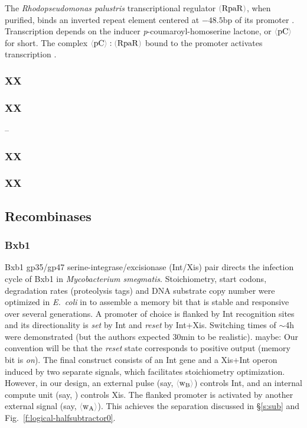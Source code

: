 \documentclass[12pt,notitlepage]{article}
\newcommand{\cbra}[1]{{\color{gray}\ensuremath{#1}}}
\newcommand{\signal}[1]{\ensuremath{\cbra{\langle}\mathrm{#1}\cbra{\rangle}}}
\newcommand{\protein}[1]{\ensuremath{\cbra{(}\mathrm{#1}\cbra{)}}}
\newcommand{\ra}[1]{{\color{Blue}#1}}
\begin{document}
\ra{
The \emph{Rhodopseudomonas palustris} transcriptional regulator
\protein{RpaR},
when purified,
binds an inverted repeat element 
centered at $-48.5$bp
of its promoter
\cite{HirakawaETAL2011}.
%
%
Transcription depends on 
the inducer 
\emph{p}-coumaroyl-homoserine lactone,
or \signal{pC} for short.
%
%
%
%
The complex 
$\signal{pC} : \protein{RpaR}$
bound to the promoter
activates transcription
\cite[Discussion]{HirakawaETAL2011}.
}


\subsubsection*{XX}



\subsubsection*{XX}

\ra{--}

\subsubsection*{XX}



\subsubsection*{XX}




\subsection{Recombinases}

\subsubsection*{Bxb1}


Bxb1 gp35/gp47
serine-integrase/excisionase
(Int/Xis)
pair
directs the infection cycle of Bxb1 
in
\emph{Mycobacterium smegmatis}.
%
Stoichiometry, start codons,
degradation rates (proteolysis tags)
and DNA substrate copy number 
were optimized 
in \emph{E.~coli}
in \cite{BonnetSubsoontornEndy2012}
to 
assemble a memory bit
that is
stable and responsive over several generations.
%
A promoter of choice is flanked 
by Int recognition sites
and
its directionality is 
\emph{set}
by Int
and 
\emph{reset}
by Int+Xis.
%
Switching times of $\sim$4h were demonstrated
(but the authors expected 30min to be realistic).
%
\ra{maybe:}
Our convention will be that
the \emph{reset} state corresponds to 
positive output (memory bit is \emph{on}).
%
The final construct
\cite[Fig.~4A]{BonnetSubsoontornEndy2012}
consists of an Int gene 
and
a Xis+Int operon
induced by two separate signals,
which facilitates stoichiometry optimization.
%
However, 
in our design,
an external pulse (say, \signal{w_B}) controls Int,
and
an internal compute unit (say, ) controls Xis.
%
The flanked promoter is activated by another
external signal (say, \signal{w_A}).
%
This achieves the separation 
discussed in \S\ref{s:sub} and Fig.~\ref{f:logical-halfsubtractor0}.
\end{document}
